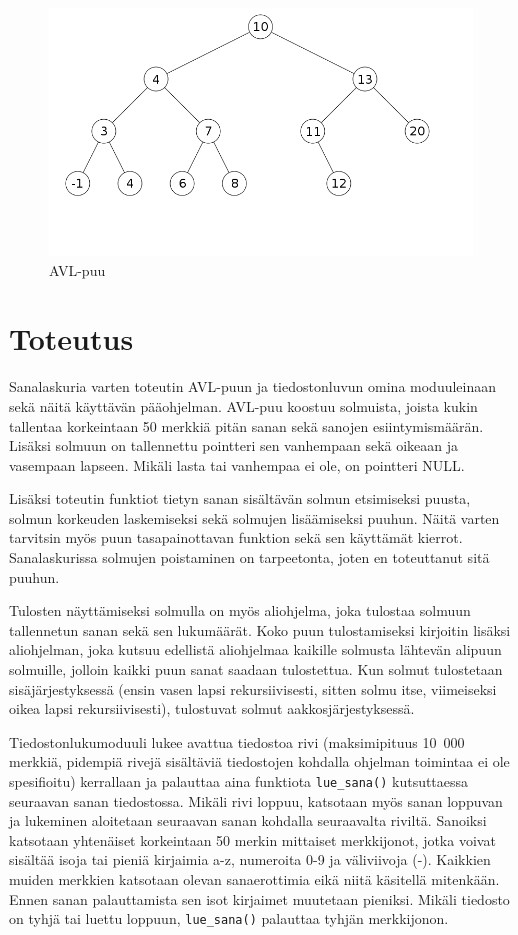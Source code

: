 \documentclass[12pt,a4paper,titlepage]{article}
\begin{document}
\begin{figure}
\centering
\includegraphics[width=15cm]{kuvat/avlpuu.png}
\caption{AVL-puu}
\label{avl}
\end{figure}


\section{Toteutus}
Sanalaskuria varten toteutin AVL-puun ja tiedostonluvun omina moduuleinaan sekä näitä käyttävän pääohjelman. AVL-puu koostuu solmuista, joista kukin tallentaa korkeintaan 50 merkkiä pitän sanan sekä sanojen esiintymismäärän. Lisäksi solmuun on tallennettu pointteri sen vanhempaan sekä oikeaan ja vasempaan lapseen. Mikäli lasta tai vanhempaa ei ole, on pointteri NULL.

Lisäksi toteutin funktiot tietyn sanan sisältävän solmun etsimiseksi puusta, solmun korkeuden laskemiseksi sekä solmujen lisäämiseksi puuhun. Näitä varten tarvitsin myös puun tasapainottavan funktion sekä sen käyttämät kierrot. Sanalaskurissa solmujen poistaminen on tarpeetonta, joten en toteuttanut sitä puuhun.

Tulosten näyttämiseksi solmulla on myös aliohjelma, joka tulostaa solmuun tallennetun sanan sekä sen lukumäärät. Koko puun tulostamiseksi kirjoitin lisäksi aliohjelman, joka kutsuu edellistä aliohjelmaa kaikille solmusta lähtevän alipuun solmuille, jolloin kaikki puun sanat saadaan tulostettua. Kun solmut tulostetaan sisäjärjestyksessä (ensin vasen lapsi rekursiivisesti, sitten solmu itse, viimeiseksi oikea lapsi rekursiivisesti), tulostuvat solmut aakkosjärjestyksessä.

Tiedostonlukumoduuli lukee avattua tiedostoa rivi (maksimipituus 10~000 merkkiä, pidempiä rivejä sisältäviä tiedostojen kohdalla ohjelman toimintaa ei ole spesifioitu) kerrallaan ja palauttaa aina funktiota \texttt{lue\_sana()} kutsuttaessa seuraavan sanan tiedostossa. Mikäli rivi loppuu, katsotaan myös sanan loppuvan ja lukeminen aloitetaan seuraavan sanan kohdalla seuraavalta riviltä. Sanoiksi katsotaan yhtenäiset korkeintaan 50 merkin mittaiset merkkijonot, jotka voivat sisältää isoja tai pieniä kirjaimia a-z, numeroita 0-9 ja väliviivoja (-). Kaikkien muiden merkkien katsotaan olevan sanaerottimia eikä niitä käsitellä mitenkään. Ennen sanan palauttamista sen isot kirjaimet muutetaan pieniksi. Mikäli tiedosto on tyhjä tai luettu loppuun, \texttt{lue\_sana()} palauttaa tyhjän merkkijonon.
\end{document}
